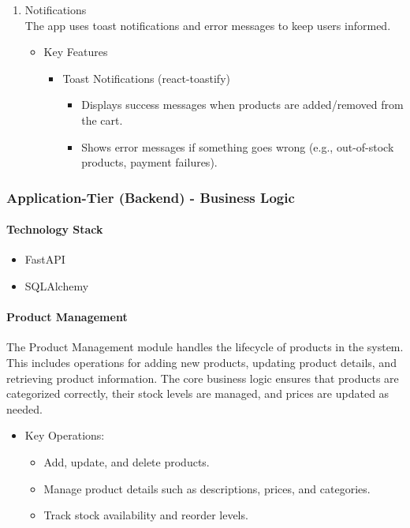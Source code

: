 \documentclass{llncs}
\begin{document}
\begin{enumerate}
    \item Notifications\\
          The app uses toast notifications and error messages to keep users informed.
          \begin{itemize}
              \item Key Features
                    \begin{itemize}
                        \item Toast Notifications (react-toastify)
                              \begin{itemize}
                                  \item Displays success messages when products are added/removed from the cart.
                                  \item Shows error messages if something goes wrong (e.g., out-of-stock products, payment failures).
                              \end{itemize}
                    \end{itemize}
          \end{itemize}
\end{enumerate}

\subsubsection{Application-Tier (Backend) - Business Logic}
\paragraph{Technology Stack}
\begin{itemize}
    \item FastAPI
    \item SQLAlchemy
\end{itemize}

\paragraph{Product Management} \leavevmode

The Product Management module handles the lifecycle of products in the system. This includes operations for adding new products, updating product details, and retrieving product information. The core business logic ensures that products are categorized correctly, their stock levels are managed, and prices are updated as needed.
\begin{itemize}
    \item Key Operations:
          \begin{itemize}
              \item Add, update, and delete products.
              \item Manage product details such as descriptions, prices, and categories.
              \item Track stock availability and reorder levels.
          \end{itemize}
\end{itemize}
\end{document}
